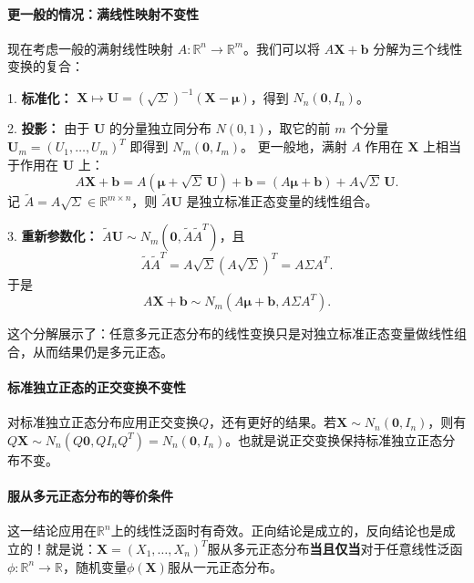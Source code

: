 \paragraph{更一般的情况：满线性映射不变性}
现在考虑一般的满射线性映射 $A: \mathbb{R}^n \to \mathbb{R}^m$。我们可以将 $A\mathbf{X} + \mathbf{b}$ 分解为三个线性变换的复合：

1. \textbf{标准化：} $\mathbf{X} \mapsto \mathbf{U} = (\sqrt{\Sigma})^{-1}(\mathbf{X} - \boldsymbol{\mu})$，得到 $N_n(\mathbf{0}, I_n)$。

2. \textbf{投影：} 由于 $\mathbf{U}$ 的分量独立同分布 $N(0,1)$，取它的前 $m$ 个分量 $\mathbf{U}_m = (U_1,\dots,U_m)^T$ 即得到 $N_m(\mathbf{0}, I_m)$。  
更一般地，满射 $A$ 作用在 $\mathbf{X}$ 上相当于作用在 $\mathbf{U}$ 上：  
\[
A\mathbf{X} + \mathbf{b} = A(\boldsymbol{\mu} + \sqrt{\Sigma}\,\mathbf{U}) + \mathbf{b}
= (A\boldsymbol{\mu} + \mathbf{b}) + A\sqrt{\Sigma}\,\mathbf{U}.
\]
记 $\tilde{A} = A\sqrt{\Sigma} \in \mathbb{R}^{m \times n}$，则 $\tilde{A}\mathbf{U}$ 是独立标准正态变量的线性组合。

3. \textbf{重新参数化：} $\tilde{A}\mathbf{U} \sim N_m(\mathbf{0}, \tilde{A}\tilde{A}^T)$，且  
\[
\tilde{A}\tilde{A}^T = A\sqrt{\Sigma} (A\sqrt{\Sigma})^T = A\Sigma A^T.
\]
于是
\[
A\mathbf{X} + \mathbf{b} \sim N_m(A\boldsymbol{\mu} + \mathbf{b}, A\Sigma A^T).
\]

这个分解展示了：任意多元正态分布的线性变换只是对独立标准正态变量做线性组合，从而结果仍是多元正态。

\paragraph{标准独立正态的正交变换不变性}
对标准独立正态分布应用正交变换$Q$，还有更好的结果。若$\mathbf{X}\sim N_n(\mathbf{0},I_n)$，则有$Q\mathbf{X} \sim N_n(Q\mathbf{0},QI_nQ^T)=N_n(\mathbf{0},I_n)$。也就是说正交变换保持标准独立正态分布不变。

\paragraph{服从多元正态分布的等价条件}
这一结论应用在$\mathbb{R}^n$上的线性泛函时有奇效。正向结论是成立的，反向结论也是成立的！就是说：$\mathbf{X}=(X_1,\ldots,X_n)^T$服从多元正态分布\textbf{当且仅当}对于任意线性泛函$\phi:\mathbb{R}^n\to \mathbb{R}$，随机变量$\phi(\mathbf{X})$服从一元正态分布。

